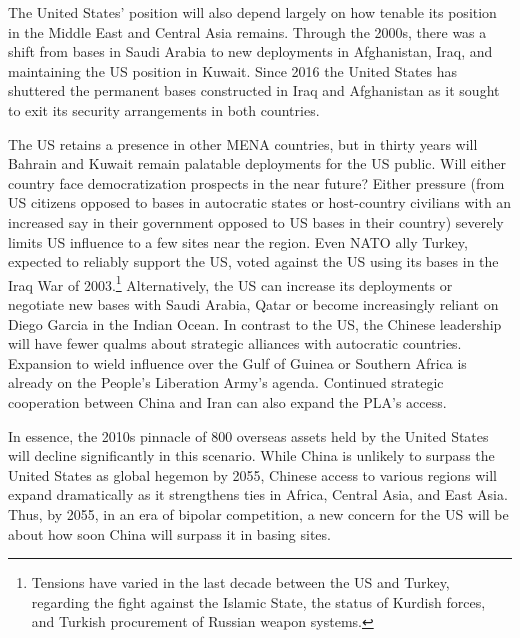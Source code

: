 The United States' position will also depend largely on how tenable its position in the Middle East and Central Asia remains. Through the 2000s, there was a shift from bases in Saudi Arabia to new deployments in Afghanistan, Iraq, and maintaining the US position in Kuwait.\cite{Engelhardt2009} Since 2016 the United States has shuttered the permanent bases constructed in Iraq and Afghanistan as it sought to exit its security arrangements in both countries. 

The US retains a presence in other MENA countries, but in thirty years will Bahrain and Kuwait  remain palatable deployments for the US public. Will either country face democratization prospects in the near future? Either pressure (from US citizens opposed to bases in autocratic states or host-country civilians with an increased say in their government opposed to US bases in their country) severely limits US influence to a few sites near the region. Even NATO ally Turkey, expected to reliably support the US, voted against the US using its bases in the Iraq War of 2003.\footnote{Tensions have varied in the last decade between the US and Turkey, regarding the fight against the Islamic State, the status of Kurdish forces, and Turkish procurement of Russian weapon systems.} Alternatively, the US can increase its deployments or negotiate new bases with Saudi Arabia, Qatar or become increasingly reliant on Diego Garcia in the Indian Ocean. In contrast to the US, the Chinese leadership will have fewer qualms about strategic alliances with autocratic countries. Expansion to wield influence over the Gulf of Guinea or Southern Africa is already on the People's Liberation Army's agenda.\cite{cabestan2020} Continued strategic cooperation between China and Iran can also expand the PLA's access.\cite{Cordesman2021} 

In essence, the 2010s pinnacle of 800 overseas assets held by the United States will decline significantly in this scenario. While China is unlikely to surpass the United States as global hegemon by 2055, Chinese access to various regions will expand dramatically as it strengthens ties in Africa, Central Asia, and East Asia. Thus, by 2055, in an era of bipolar competition, a new concern for the US will be about how soon China will surpass it in basing sites. 

